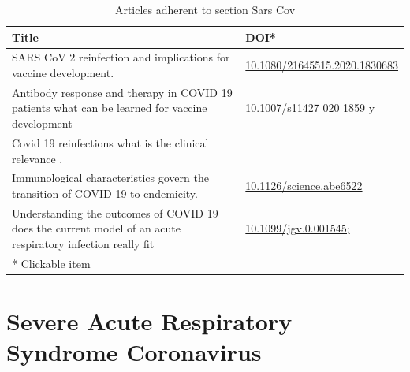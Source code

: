 \documentclass{qqtarticle}
\begin{document}
        \begin{table}[H]
        \scriptsize
        \centering
        \caption{Articles adherent to section Sars Cov}
        \renewcommand{\arraystretch}{1.5}
        \begin{tabular}{p{}l}
            \toprule 
            Title & DOI* \\     \midrule SARS CoV 2 reinfection and implications for vaccine development. \cite{SARSCoV210db862e} & \href{https://dx.doi.org/10.1080/21645515.2020.1830683}{10.1080/21645515.2020.1830683}\\Antibody response and therapy in COVID 19 patients  what can be learned for vaccine development  \cite{Antibodyrdbaca950} & \href{https://dx.doi.org/10.1007/s11427 020 1859 y}{10.1007/s11427 020 1859 y}\\Covid 19 reinfections  what is the clinical relevance . \cite{Covid19r7a804982} & \href{https://dx.doi.org/}{}\\Immunological characteristics govern the transition of COVID 19 to endemicity. \cite{Immunologi93675c35} & \href{https://dx.doi.org/10.1126/science.abe6522}{10.1126/science.abe6522}\\Understanding the outcomes of COVID 19   does the current model of an acute respiratory infection really fit  \cite{Understandcfb641dd} & \href{https://dx.doi.org/10.1099/jgv.0.001545; }{10.1099/jgv.0.001545; }\\     \midrule
            * Clickable item \\
            \bottomrule
        \end{tabular}
        \label{tab:topic11}
        \end{table}\section{Severe Acute Respiratory Syndrome Coronavirus}
\end{document}
